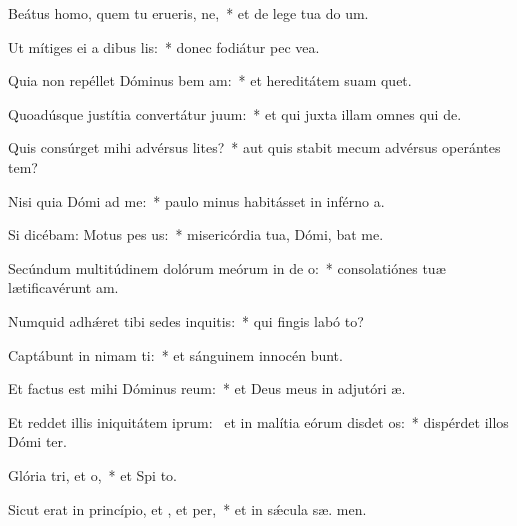 \item Beátus homo, quem tu erueris, ne,~* et de lege tua do um.
\item Ut mítiges ei a dibus lis:~* donec fodiátur pec vea.
\item Quia non repéllet Dóminus bem am:~* et hereditátem suam  quet.
\item Quoadúsque justítia convertátur  juum:~* et qui juxta illam omnes qui   de.
\item Quis consúrget mihi advérsus lites?~* aut quis stabit mecum advérsus operántes tem?
\item Nisi quia Dómi ad me:~* paulo minus habitásset in inférno  a.
\item Si dicébam: Motus  pes us:~* misericórdia tua, Dómi, bat me.
\item Secúndum multitúdinem dolórum meórum in de o:~* consolatiónes tuæ lætificavérunt  am.
\item Numquid adhǽret tibi sedes inquitis:~* qui fingis labó  to?
\item Captábunt in nimam ti:~* et sánguinem innocén bunt.
\item Et factus est mihi Dóminus  reum:~* et Deus meus in adjutóri  æ.
\item Et reddet illis iniquitátem iprum:~\pscross{} et in malítia eórum disdet os:~* dispérdet illos Dómi  ter.
\item Glória tri, et o,~* et Spi to.
\item Sicut erat in princípio, et , et per,~* et in sǽcula sæ. men.
